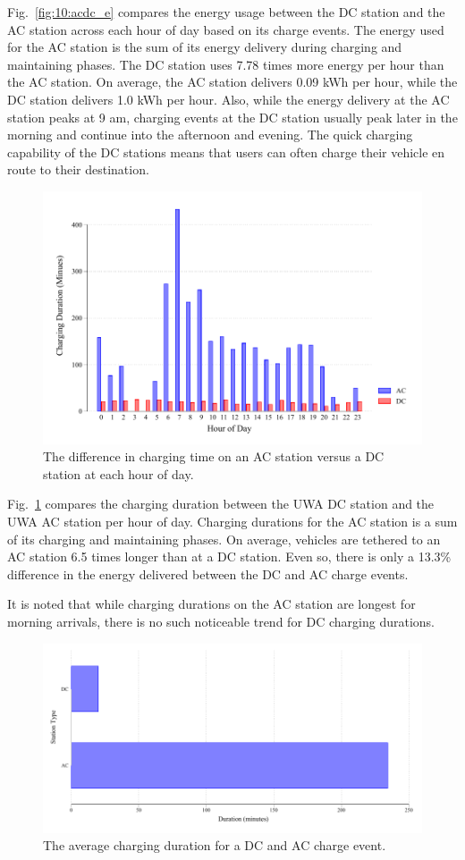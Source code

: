 Fig.~\ref{fig:10:acdc_e} compares the energy usage between the DC station and the AC station across each hour of day based on its charge events. The energy used for the AC station is the sum of its energy delivery during charging and maintaining phases. The DC station uses 7.78 times more energy per hour than the AC station. On average, the AC station delivers 0.09 kWh per hour, while the DC station delivers 1.0 kWh per hour. Also, while the energy delivery at the AC station peaks at 9 am, charging events at the DC station usually peak later in the morning and continue into the afternoon and evening. The quick charging capability of the DC stations means that users can often charge their vehicle en route to their destination. 

\begin{figure}[H]
	\centering
	\includegraphics[width=0.8\linewidth]{acdc_h}
	\caption[Charging time on an AC station versus a DC station]{The difference in charging time on an AC station versus a DC station at each hour of day.}
	\label{fig:10:acdc_h}
\end{figure}

Fig.~\ref{fig:10:acdc_h} compares the charging duration between the UWA DC station and the UWA AC station per hour of day. Charging durations for the AC station is a sum of its charging and maintaining phases. On average, vehicles are tethered to an AC station 6.5 times longer than at a DC station. Even so, there is only a 13.3\% difference in the energy delivered between the DC and AC charge events. 

It is noted that while charging durations on the AC station are longest for morning arrivals, there is no such noticeable trend for DC charging durations. 

\begin{figure}[H]
	\centering
	\includegraphics[width=0.8\linewidth]{acdc_t_h}
	\caption{The average charging duration for a DC and AC charge event.}
	\label{fig:10:acdc_t_h}
\end{figure}

